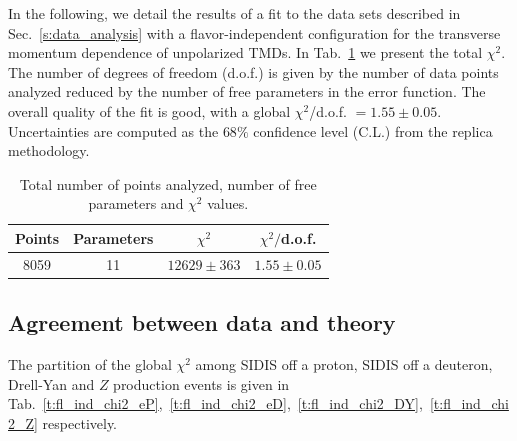 \documentclass[aps,preprintnumbers,showpacs,nofootinbib,superscriptaddress,floatfix]{revtex4}
\newcommand{\hermes}{\textsc{Hermes}}
\newcommand{\compass}{\textsc{Compass}}
\begin{document}
In the following, we detail the results of a fit to the data sets described in
Sec.~\ref{s:data_analysis} with a flavor-independent configuration for the
transverse momentum dependence of unpolarized TMDs. 
In Tab.~\ref{t:fl_ind_chi2} we present the total $\chi^2$. The number of
degrees of freedom (d.o.f.) is given by the number of data points analyzed
reduced by the number of free parameters in the error function.  
The overall quality of the fit is good, with a global $\chi^2$/d.o.f. $= 1.55 \pm 0.05$. Uncertainties are computed as the $68\%$ confidence level (C.L.) from the replica methodology. 
\begin{table}[h!]
\small
  \centering
  \begin{tabular}{|c|c|c|c|}
\hline
\hline
Points& Parameters & $\chi^2$& $\chi^2/$d.o.f. \\
\hline
8059 & 11  & $12629 \pm 363$ & $1.55 \pm 0.05$ \\
\hline
\hline
\end{tabular}
\caption{Total number of points analyzed, number of free parameters and $\chi^2$ values.}
\label{t:fl_ind_chi2}
\end{table}


\subsection{Agreement between data and theory}
\label{ss:data_vs_theory}

The partition of the global $\chi^2$ among SIDIS off a proton, SIDIS off a
deuteron, Drell-Yan and $Z$ production events is given in
Tab.~\ref{t:fl_ind_chi2_eP},~\ref{t:fl_ind_chi2_eD},~\ref{t:fl_ind_chi2_DY},~\ref{t:fl_ind_chi2_Z}
respectively.  
\end{document}
